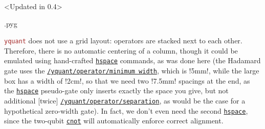 \documentclass{scrartcl}
\makeatletter
\newenvironment{codeexample}{%
   \VerbatimEnvironment%
   \let\FVB@VerbatimOut\minted@FVB@VerbatimOut
   \let\FVE@VerbatimOut\minted@FVE@VerbatimOut
   \minted@configlang{tex}%
   \minted@fvset
   \begin{VerbatimOut}[codes={\catcode`\^^I=12},firstline,lastline]{\minted@jobname.pyg}%
}{
   \end{VerbatimOut}%
   \minted@langlinenoson%
   \savebox\codeexamplebox{ \minted@jobname.pyg}%
   \ifdim\wd\codeexamplebox>\dimexpr.5\linewidth-3mm\relax%
      \wd\codeexamplebox=.5\linewidth%
   \else%
      \wd\codeexamplebox=\dimexpr\wd\codeexamplebox+3mm\relax%
   \fi%
   \noindent\begin{minipage}{\wd\codeexamplebox}%
      \centering%
      \usebox\codeexamplebox%
   \end{minipage}%
   \begin{minipage}{\dimexpr\linewidth-\wd\codeexamplebox\relax}%
      \minted@pygmentize{\minted@lang}%
   \end{minipage}%
   \minted@langlinenosoff%
   \par%
}
\def\pkg#1{\textcolor{brown}{\texttt{#1}}}
\def\gate#1{\hyperref[gate:#1]{\texttt{#1}}}
\def\style#1{\hyperref[style:#1]{\texttt{#1}}}
\def\Yquant{\pkg{yquant}}
\makeatother
\begin{document}
            \begin{example}<Updated in 0.4>
               \begin{codeexample}
               \end{codeexample}
               \Yquant{} does not use a grid layout: operators are stacked next to each other.
               Therefore, there is no automatic centering of a column, though it could be emulated using hand-crafted \gate{hspace} commands, as was done here (the Hadamard gate uses the \style{/yquant/operator/minimum width}, which is \tex!5mm!, while the large box has a width of \tex!2cm!, so that we need two \tex!7.5mm! spacings at the end, as the \gate{hspace} pseudo\hyp gate only inserts exactly the space you give, but not additional [twice] \style{/yquant/operator/separation}, as would be the case for a hypothetical zero\hyp width gate).
               In fact, we don't even need the second \gate{hspace}, since the two\hyp qubit \gate{cnot} will automatically enforce correct alignment.
            \end{example}
\end{document}
